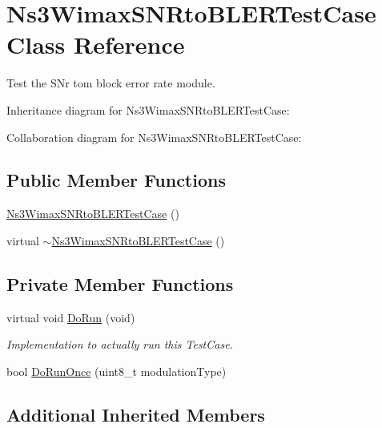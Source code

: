 \hypertarget{classNs3WimaxSNRtoBLERTestCase}{}\section{Ns3\+Wimax\+S\+N\+Rto\+B\+L\+E\+R\+Test\+Case Class Reference}
\label{classNs3WimaxSNRtoBLERTestCase}


Test the S\+Nr tom block error rate module.  




Inheritance diagram for Ns3\+Wimax\+S\+N\+Rto\+B\+L\+E\+R\+Test\+Case\+:


Collaboration diagram for Ns3\+Wimax\+S\+N\+Rto\+B\+L\+E\+R\+Test\+Case\+:
\subsection*{Public Member Functions}
\begin{DoxyCompactItemize}
\item 
\hyperlink{classNs3WimaxSNRtoBLERTestCase_acfe2eb6d86f3ea66de4d4e293ce4d5f5}{Ns3\+Wimax\+S\+N\+Rto\+B\+L\+E\+R\+Test\+Case} ()
\item 
virtual \hyperlink{classNs3WimaxSNRtoBLERTestCase_af6c25e7ceadadb3b76ad6ff338c6d9ff}{$\sim$\+Ns3\+Wimax\+S\+N\+Rto\+B\+L\+E\+R\+Test\+Case} ()
\end{DoxyCompactItemize}
\subsection*{Private Member Functions}
\begin{DoxyCompactItemize}
\item 
virtual void \hyperlink{classNs3WimaxSNRtoBLERTestCase_ac9aa61cf78b1f131079090a055b08e66}{Do\+Run} (void)
\begin{DoxyCompactList}\small\item\em Implementation to actually run this Test\+Case. \end{DoxyCompactList}\item 
bool \hyperlink{classNs3WimaxSNRtoBLERTestCase_a64943c3525014a282678a8a7186c6273}{Do\+Run\+Once} (uint8\+\_\+t modulation\+Type)
\end{DoxyCompactItemize}
\subsection*{Additional Inherited Members}


